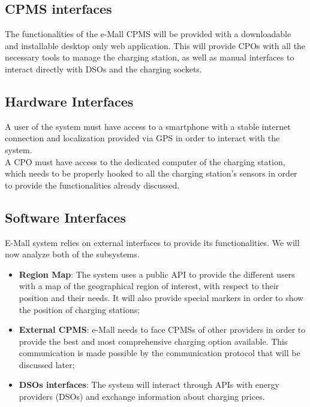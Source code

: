 \documentclass[12pt]{report}
\begin{document}
\subsection{CPMS interfaces}
The functionalities of the e-Mall CPMS will be provided with a downloadable and installable desktop only web application. 
This will provide CPOs with all the necessary tools to manage the charging station, as well as manual interfaces to interact directly with DSOs and the charging sockets.

 

\subsection{Hardware Interfaces}

A user of the system must have access to a smartphone with a stable internet connection and localization provided via GPS in order to interact with the system.\\
A CPO must have access to the dedicated computer of the charging station, which needs to be properly hooked to all the charging station’s sensors in order to provide the functionalities already discussed.

 

\subsection{Software Interfaces}

E-Mall system relies on external interfaces to provide its functionalities. We will now analyze both of the subsystems.
\begin{itemize}
        \item\textbf{Region Map}: The system uses a public API to provide the different users with a map of the geographical region of interest, with respect to their position and their needs. It will also provide special markers in order to show the position of charging stations;
        \item\textbf{External CPMS}: e-Mall needs to face CPMSs of other providers in order to provide the best and most comprehensive charging option available. This communication is made possible by the communication protocol that will be discussed later;
        \item\textbf{DSOs interfaces}: The system will interact through APIs with energy providers (DSOs) and exchange information about charging prices.
\end{itemize}
\end{document}
